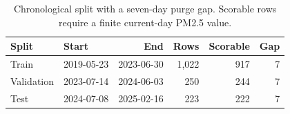 \begin{table}[htbp]
\centering
\small
\caption{Chronological split with a seven-day purge gap. Scorable rows require a finite current-day PM2.5 value.}
\label{tab:split}
\begin{tabular}{llrrrr}
\toprule
Split & Start & End & Rows & Scorable & Gap \\
\midrule
Train & 2019-05-23 & 2023-06-30 & 1,022 & 917 & 7 \\
Validation & 2023-07-14 & 2024-06-03 & 250 & 244 & 7 \\
Test & 2024-07-08 & 2025-02-16 & 223 & 222 & 7 \\
\bottomrule
\end{tabular}

\end{table}
